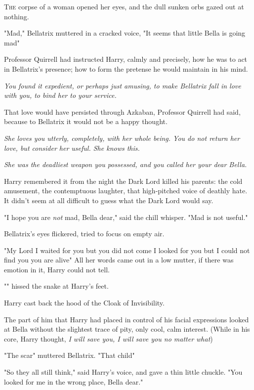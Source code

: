 
\lettrine{T}{he} corpse of a
woman opened her eyes, and the dull sunken orbs gazed out at nothing.

"Mad," Bellatrix muttered in a cracked voice, "It seems that little Bella is
going mad{\el}"

Professor Quirrell had instructed Harry, calmly and precisely, how he was to
act in Bellatrix's presence; how to form the pretense he would maintain in his
mind.

\emph{You found it expedient, or perhaps just amusing, to make Bellatrix fall
in love with you, to bind her to your service.}

That love would have persisted through Azkaban, Professor Quirrell had said,
because to Bellatrix it would not be a happy thought.

\emph{She loves you utterly, completely, with her whole being. You do not
return her love, but consider her useful. She knows this.}

\emph{She was the deadliest weapon you possessed, and you called her your dear
Bella.}

Harry remembered it from the night the Dark Lord killed his parents: the cold
amusement, the contemptuous laughter, that high-pitched voice of deathly hate.
It didn't seem at all difficult to guess what the Dark Lord would say.

"I hope you are \emph{not} mad, Bella dear," said the chill whisper. "Mad is
not useful."

Bellatrix's eyes flickered, tried to focus on empty air.

"My{\el} Lord{\el} I waited for you but you did not come{\el} I looked
for you but I could not find you{\el} you are alive{\el}" All her words
came out in a low mutter, if there was emotion in it, Harry could not tell.

"" hissed the snake at Harry's feet.

Harry cast back the hood of the Cloak of Invisibility.

The part of him that Harry had placed in control of his facial expressions
looked at Bella without the slightest trace of pity, only cool, calm interest.
(While in his core, Harry thought, \emph{I will save you, I will save you no
matter what{\el}})

"The scar{\el}" muttered Bellatrix. "That child{\el}"

"So they all still think," said Harry's voice, and gave a thin little chuckle.
"You looked for me in the wrong place, Bella dear."

